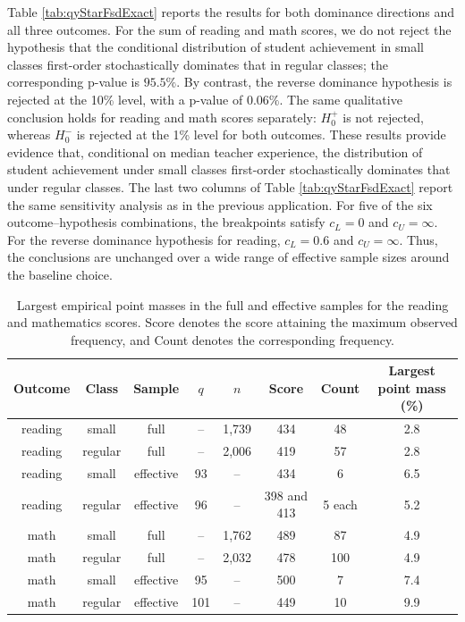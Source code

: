 \documentclass[11pt]{article}
\numberwithin{equation}{section}
\begin{document}
Table \ref{tab:qyStarFsdExact} reports the results for both dominance directions and all three outcomes. For the sum of reading and math scores, we do not reject the hypothesis that the conditional distribution of student achievement in small classes first-order stochastically dominates that in regular classes; the corresponding p-value is $95.5\%$. By contrast, the reverse dominance hypothesis is rejected at the 10\% level, with a p-value of $0.06\%$. The same qualitative conclusion holds for reading and math scores separately: $H^+_0$ is not rejected, whereas $H^-_0$ is rejected at the 1\% level for both outcomes. These results provide evidence that, conditional on median teacher experience, the distribution of student achievement under small classes first-order stochastically dominates that under regular classes. The last two columns of Table \ref{tab:qyStarFsdExact} report the same sensitivity analysis as in the previous application. For five of the six outcome--hypothesis combinations, the breakpoints satisfy $c_L=0$ and $c_U=\infty$. For the reverse dominance hypothesis for reading, $c_L=0.6$ and $c_U=\infty$. Thus, the conclusions are unchanged over a wide range of effective sample sizes around the baseline choice.

\begin{table}[h]\small
    \centering
    \begin{tabular}{cccccccc}
        \hline
        Outcome & Class & Sample & $q$ & $n$
        & Score & Count & Largest point mass (\%) \\
        \hline
        reading & small   & full      & --  & 1,739 & 434         & 48       & 2.8 \\
        reading & regular & full      & --  & 2,006 & 419         & 57       & 2.8 \\
        reading & small   & effective & 93  & --   & 434         & 6        & 6.5 \\
        reading & regular & effective & 96  & --   & 398 and 413         & 5 each     & 5.2 \\
        \hline
        math    & small   & full      & --  & 1,762 & 489         & 87       & 4.9 \\
        math    & regular & full      & --  & 2,032 & 478         & 100      & 4.9 \\
        math    & small   & effective & 95  & --   & 500          & 7       & 7.4\\
        math    & regular & effective & 101 & --   & 449         & 10       & 9.9 \\
        \hline
    \end{tabular}
    \caption{\small Largest empirical point masses in the full and effective
    samples for the reading and mathematics scores. Score denotes the score attaining the maximum observed frequency, and Count denotes the corresponding frequency.}
    \label{tab:star-score-point-masses}
\end{table}
\end{document}
